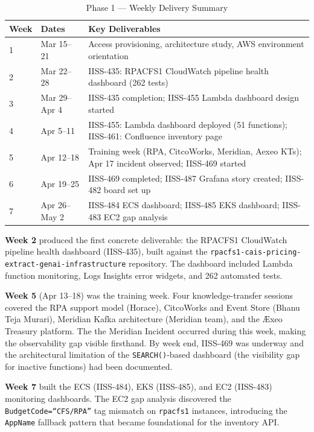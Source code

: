 \begin{table}[ht]
\centering
\caption{Phase 1 --- Weekly Delivery Summary}
\label{tab:wb_phase1}
\begin{tabular}{p{1.2cm}p{4.0cm}p{7.5cm}}
\toprule
\textbf{Week} & \textbf{Dates} & \textbf{Key Deliverables} \\
\midrule
1 & Mar 15--21 & Access provisioning, architecture study, AWS environment orientation \\
2 & Mar 22--28 & IISS-435: RPACFS1 CloudWatch pipeline health dashboard (262 tests) \\
3 & Mar 29--Apr 4 & IISS-435 completion; IISS-455 Lambda dashboard design started \\
4 & Apr 5--11 & IISS-455: Lambda dashboard deployed (51 functions); IISS-461: Confluence inventory page \\
5 & Apr 12--18 & Training week (RPA, CitcoWorks, Meridian, Aexeo KTs); Apr 17 incident observed; IISS-469 started \\
6 & Apr 19--25 & IISS-469 completed; IISS-487 Grafana story created; IISS-482 board set up \\
7 & Apr 26--May 2 & IISS-484 ECS dashboard; IISS-485 EKS dashboard; IISS-483 EC2 gap analysis \\
\bottomrule
\end{tabular}
\end{table}

\textbf{Week 2} produced the first concrete deliverable: the RPACFS1
CloudWatch pipeline health dashboard (IISS-435), built against the
\texttt{rpacfs1-cais-pricing-extract-genai-infrastructure} repository. The
dashboard included Lambda function monitoring, Logs Insights error widgets,
and 262 automated tests.

\textbf{Week 5} (Apr 13--18) was the training week. Four knowledge-transfer
sessions covered the RPA support model (Horace), CitcoWorks and Event Store
(Bhanu Teja Murari), Meridian Kafka architecture (Meridian team), and the
\AE xeo Treasury platform. The the Meridian Incident occurred during this
week, making the observability gap visible firsthand. By week end, IISS-469
was underway and the architectural limitation of the \texttt{SEARCH()}-based
dashboard (the visibility gap for inactive functions) had been documented.

\textbf{Week 7} built the ECS (IISS-484), EKS (IISS-485), and EC2 (IISS-483)
monitoring dashboards. The EC2 gap analysis discovered the
\texttt{BudgetCode=``CFS/RPA''} tag mismatch on \texttt{rpacfs1} instances,
introducing the \texttt{AppName} fallback pattern that became foundational for
the inventory API.

